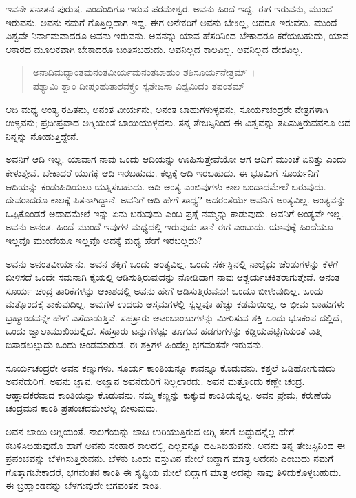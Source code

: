ಇವನೇ ಸನಾತನ ಪುರುಷ. ಎಂದೆಂದಿಗೂ ಇರುವ ಪರಮೇಶ್ವರ. ಅವನು ಹಿಂದೆ ಇದ್ದ, ಈಗ ಇರುವನು, ಮುಂದೆ ಇರುವನು. ಅವನು ನಮಗೆ ಗೊತ್ತಿಲ್ಲದಾಗ ಇದ್ದ. ಈಗ ಅನೇಕರಿಗೆ ಅವನು ಬೇಕಿಲ್ಲ, ಆದರೂ ಇರುವನು. ಮುಂದೆ ವಿಶ್ವವೇ ನಿರ್ನಾಮವಾದರೂ ಅವನು ಇರುವನು. ಅವನನ್ನು ಯಾವ ಹೆಸರಿನಿಂದ ಬೇಕಾದರೂ ಕರೆಯಬಹುದು, ಯಾವ ಆಕಾರದ ಮೂಲಕವಾಗಿ ಬೇಕಾದರೂ ಚಿಂತಿಸಬಹುದು. ಅವನಿಲ್ಲದ ಕಾಲವಿಲ್ಲ. ಅವನಿಲ್ಲದ ದೇಶವಿಲ್ಲ.

\begin{verse}
ಅನಾದಿಮಧ್ಯಾಂತಮನಂತವೀರ್ಯಮನಂತಬಾಹುಂ ಶಶಿಸೂರ್ಯನೇತ್ರಮ್~।\\ಪಶ್ಯಾಮಿ ತ್ವಾಂ ದೀಪ್ತಂಹುತಾಶವಕ್ತ್ರಂ ಸ್ವತೇಜಸಾ ವಿಶ್ವಮಿದಂ ತಪಂತಮ್ 
\end{verse}

{\small ಆದಿ ಮಧ್ಯ ಅಂತ್ಯ ರಹಿತನು, ಅನಂತ ವೀರ್ಯನು, ಅನಂತ ಬಾಹುಗಳುಳ್ಳವನು, ಸೂರ್ಯಚಂದ್ರರೇ ನೇತ್ರಗಳಾಗಿ ಉಳ್ಳವನು; ಪ್ರದೀಪ್ತವಾದ ಅಗ್ನಿಯಂತೆ ಬಾಯಿಯುಳ್ಳವನು. ತನ್ನ ತೇಜಸ್ಸಿನಿಂದ ಈ ವಿಶ್ವವನ್ನು ತಪಿಸುತ್ತಿರುವವನೂ ಆದ ನಿನ್ನನ್ನು ನೋಡುತ್ತಿದ್ದೇನೆ.}

ಅವನಿಗೆ ಆದಿ ಇಲ್ಲ. ಯಾವಾಗ ನಾವು ಒಂದು ಆದಿಯನ್ನು ಊಹಿಸುತ್ತೇವೆಯೋ ಆಗ ಆದಿಗೆ ಮುಂಚೆ ಏನಿತ್ತು ಎಂದು ಕೇಳುತ್ತೇವೆ. ಬೇಕಾದರೆ ಯುಗಕ್ಕೆ ಆದಿ ಇರಬಹುದು. ಕಲ್ಪಕ್ಕೆ ಆದಿ ಇರಬಹುದು. ಈ ಭೂಮಿಗೆ ಸೂರ್ಯನಿಗೆ ಆದಿಯನ್ನು ಕಂಡುಹಿಡಿಯಲು ಯತ್ನಿಸಬಹುದು. ಆದಿ ಅಂತ್ಯ ಎಂಬಿವುಗಳು ಕಾಲ ಬಂದಾದಮೇಲೆ ಬರುವುದು. ದೇವರಾದರೊ ಕಾಲಕ್ಕೆ ಪಿತನಾಗಿದ್ದಾನೆ. ಅವನಿಗೆ ಆದಿ ಹೇಗೆ ಸಾಧ್ಯ? ಅದರಂತೆಯೇ ಅವನಿಗೆ ಅಂತ್ಯವಿಲ್ಲ. ಅಂತ್ಯವನ್ನು ಒಪ್ಪಿಕೊಂಡರೆ ಅದಾದಮೇಲೆ ಇನ್ನು ಏನು ಬರುವುದು ಎಂಬ ಪ್ರಶ್ನೆ ನಮ್ಮನ್ನು ಕಾಡುವುದು. ಅವನಿಗೆ ಅಂತ್ಯವೇ ಇಲ್ಲ. ಅವನು ಅನಂತ. ಹಿಂದೆ ಮುಂದೆ ಇವುಗಳ ಮಧ್ಯದಲ್ಲಿ ಇರುವುದು ತಾನೆ ಈಗ ಎಂಬುದು. ಯಾವುಕ್ಕೆ ಹಿಂದೆಯೂ ಇಲ್ಲವೊ ಮುಂದೆಯೂ ಇಲ್ಲವೊ ಅದಕ್ಕೆ ಮಧ್ಯ ಹೇಗೆ ಇರಬಲ್ಲದು?

ಅವನು ಅನಂತವೀರ್ಯನು. ಅವನ ಶಕ್ತಿಗೆ ಒಂದು ಅಂತ್ಯವಿಲ್ಲ. ಒಂದು ಸರ್ಕಸ್ಸಿನಲ್ಲಿ ನಾಲ್ಕೈದು ಚೆಂಡುಗಳನ್ನು ಕೆಳಗೆ ಬೀಳಿಸದೆ ಒಂದೇ ಸಮನಾಗಿ ಕೈಯಲ್ಲಿ ಆಡಿಸುತ್ತಿರುವುದನ್ನು ನೋಡಿದಾಗ ನಾವು ಆಶ್ಚರ್ಯಚಕಿತರಾಗುತ್ತೇವೆ. ಅನಂತ ಸೂರ್ಯ ಚಂದ್ರ ತಾರಿಕೆಗಳನ್ನು ಆಕಾಶದಲ್ಲಿ ಅವನು ಹೇಗೆ ಆಡಿಸುತ್ತಿರುವನು! ಒಂದೂ ಬೀಳುವುದಿಲ್ಲ. ಒಂದು ಮತ್ತೊಂದಕ್ಕೆ ತಾಕುವುದಿಲ್ಲ. ಅವುಗಳ ಉದಯ ಅಸ್ತಮಗಳಲ್ಲಿ ಸ್ವಲ್ಪವೂ ಹೆಚ್ಚು ಕಡಮೆಯಿಲ್ಲ. ಆ ಭೀಮ ಬಾಹುಗಳು ಬ್ರಹ್ಮಾಂಡವನ್ನೇ ಹೇಗೆ ಎಸೆದಾಡುತ್ತಿವೆ. ಸಹಸ್ರಾರು ಆಟಂಬಾಂಬುಗಳನ್ನು ಮೀರಿಸುವ ಶಕ್ತಿ ಒಂದು ಭೂಕಂಪ ದಲ್ಲಿದೆ, ಒಂದು ಜ್ವಾಲಾಮುಖಿಯಲ್ಲಿದೆ. ಸಹಸ್ರಾರು ಟನ್ನುಗಳಷ್ಟು ತೂಗುವ ಹಡಗುಗಳನ್ನು ಕಡ್ಡಿಯಪೆಟ್ಟಿಗೆಯಂತೆ ಎತ್ತಿ ಬಿಸಾಡಬಲ್ಲುದು ಒಂದು ಚಂಡಮಾರುಡ. ಈ ಶಕ್ತಿಗಳ ಹಿಂದೆಲ್ಲ ಭಗವಂತನೇ ಇರುವನು.

ಸೂರ್ಯಚಂದ್ರರೇ ಅವನ ಕಣ್ಣುಗಳು. ಸೂರ್ಯ ಕಾಂತಿಯನ್ನೂ ಕಾವನ್ನೂ ಕೊಡುವನು. ಕತ್ತಲೆ ಓಡಿಹೋಗುವುದು ಅವನೆದುರಿಗೆ. ಅವನು ಜ್ಞಾನ. ಅಜ್ಞಾನ ಅವನೆದುರಿಗೆ ನಿಲ್ಲಲಾರದು. ಅವನ ಮತ್ತೊಂದು ಕಣ್ಣೇ ಚಂದ್ರ. ಆಹ್ಲಾದಕರವಾದ ಕಾಂತಿಯನ್ನು ಕೊಡುವನು. ನಮ್ಮ ಕಣ್ಣನ್ನು ಕುಕ್ಕುವ ಕಾಂತಿಯನ್ನಲ್ಲ. ಅವನ ಪ್ರೇಮ, ಕರುಣೆಯ ಚಂದ್ರಮನ ಕಾಂತಿ ಪ್ರಪಂಚದಮೇಲೆಲ್ಲ ಬೀಳುವುದು.

ಅವನ ಬಾಯಿ ಅಗ್ನಿಯಂತೆ. ನಾಲಗೆಯನ್ನು ಚಾಚಿ ಉರಿಯುತ್ತಿರುವ ಅಗ್ನಿ ತನಗೆ ಬಿದ್ದುದನ್ನೆಲ್ಲ ಹೇಗೆ ಕಬಳಿಸಿಬಿಡುವುದೊ ಹಾಗೆ ಅವನು ಸಂಹಾರ ಕಾಲದಲ್ಲಿ ಎಲ್ಲವನ್ನೂ ದಹಿಸಿಬಿಡುವನು. ಅವನು ತನ್ನ ತೇಜಸ್ಸಿನಿಂದ ಈ ಪ್ರಪಂಚವನ್ನು ಬೆಳಗಿಸುತ್ತಿರುವನು. ಬೆಳಕು ಒಂದು ವಸ್ತುವಿನ ಮೇಲೆ ಬಿದ್ದಾಗ ಮಾತ್ರ ಅದೇನು ಎಂಬುದು ನಮಗೆ ಗೊತ್ತಾಗಬೇಕಾದರೆ, ಭಗವಂತನ ಕಾಂತಿ ಈ ಸೃಷ್ಟಿಯ ಮೇಲೆ ಬಿದ್ದಾಗ ಮಾತ್ರ ಅದನ್ನು ನಾವು ತಿಳಿದುಕೊಳ್ಳಬಹುದು. ಈ ಬ್ರಹ್ಮಾಂಡವನ್ನು ಬೆಳಗುವುದೇ ಭಗವಂತನ ಕಾಂತಿ.

